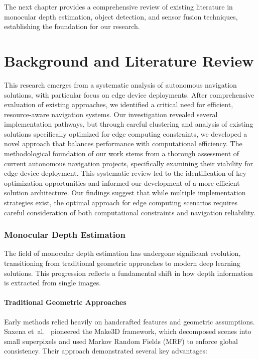 \documentclass[12pt,oneside]{book}
\begin{document}
\vspace{12pt}
The next chapter provides a comprehensive review of existing literature in monocular depth estimation, object detection, and sensor fusion techniques, establishing the foundation for our research.

\chapter{Background and Literature Review}
This research emerges from a systematic analysis of autonomous navigation solutions, with particular focus on edge device deployments. After comprehensive evaluation of existing approaches, we identified a critical need for efficient, resource-aware navigation systems. Our investigation revealed several implementation pathways, but through careful clustering and analysis of existing solutions specifically optimized for edge computing constraints, we developed a novel approach that balances performance with computational efficiency.
The methodological foundation of our work stems from a thorough assessment of current autonomous navigation projects, specifically examining their viability for edge device deployment. This systematic review led to the identification of key optimization opportunities and informed our development of a more efficient solution architecture. Our findings suggest that while multiple implementation strategies exist, the optimal approach for edge computing scenarios requires careful consideration of both computational constraints and navigation reliability.

\subsection{Monocular Depth Estimation}

The field of monocular depth estimation has undergone significant evolution, transitioning from traditional geometric approaches to modern deep learning solutions. This progression reflects a fundamental shift in how depth information is extracted from single images.

\subsubsection{Traditional Geometric Approaches}
Early methods relied heavily on handcrafted features and geometric assumptions. Saxena et~al.~\cite{saxena2009make3d} pioneered the Make3D framework, which decomposed scenes into small superpixels and used Markov Random Fields (MRF) to enforce global consistency. Their approach demonstrated several key advantages:
\end{document}
